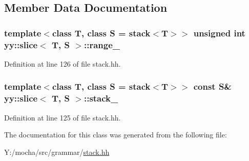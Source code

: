 \subsection{Member Data Documentation}
\hypertarget{classyy_1_1slice_ab9c0f9775d55a20ebab97e056a7cd152}{
\subsubsection[{range\_\-}]{\setlength{\rightskip}{0pt plus 5cm}template$<$class T, class S = stack$<$T$>$$>$ unsigned int {\bf yy::slice}$<$ T, S $>$::{\bf range\_\-}}}
\label{classyy_1_1slice_ab9c0f9775d55a20ebab97e056a7cd152}


Definition at line 126 of file stack.hh.

\hypertarget{classyy_1_1slice_a0fe0ae83463e410ba2e2f6fc1e1d1fc4}{
\subsubsection[{stack\_\-}]{\setlength{\rightskip}{0pt plus 5cm}template$<$class T, class S = stack$<$T$>$$>$ const S\& {\bf yy::slice}$<$ T, S $>$::{\bf stack\_\-}}}
\label{classyy_1_1slice_a0fe0ae83463e410ba2e2f6fc1e1d1fc4}


Definition at line 125 of file stack.hh.



The documentation for this class was generated from the following file:\begin{DoxyCompactItemize}
\item 
Y:/mocha/src/grammar/\hyperlink{stack_8hh}{stack.hh}\end{DoxyCompactItemize}
